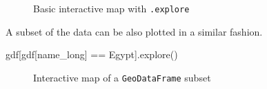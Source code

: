 \documentclass[
  letterpaper,
]{krantz}
\newenvironment{Shaded}{\begin{snugshade}}{\end{snugshade}}
\newcommand{\NormalTok}[1]{\textcolor[rgb]{0.00,0.23,0.31}{#1}}
\newcommand{\OperatorTok}[1]{\textcolor[rgb]{0.37,0.37,0.37}{#1}}
\newcommand{\StringTok}[1]{\textcolor[rgb]{0.13,0.47,0.30}{#1}}
\begin{document}
\begin{figure}


\caption{\label{fig-gdf-explore}Basic interactive map with
\texttt{.explore}}

\end{figure}%

A subset of the data can be also plotted in a similar fashion.

\begin{Shaded}
\begin{Highlighting}[]
\NormalTok{gdf[gdf[}\StringTok{\textquotesingle{}name\_long\textquotesingle{}}\NormalTok{] }\OperatorTok{==} \StringTok{\textquotesingle{}Egypt\textquotesingle{}}\NormalTok{].explore()}
\end{Highlighting}
\end{Shaded}

\begin{figure}


\caption{\label{fig-gdf-explore2}Interactive map of a
\texttt{GeoDataFrame} subset}

\end{figure}%
\end{document}
